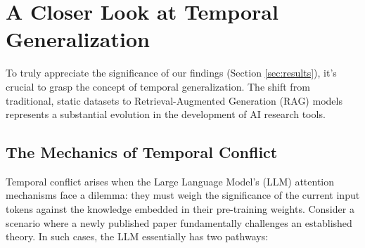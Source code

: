 \documentclass[acmsmall,screen,nonacm]{acmart}
\begin{document}
\begin{table}[t]
\caption{Looking at how our approach differs from existing research.}
\label{tab:comparative}
\centering
{}
\end{table}

\section{A Closer Look at Temporal Generalization}

To truly appreciate the significance of our findings (Section \ref{sec:results}), it's crucial to grasp the concept of temporal generalization. The shift from traditional, static datasets to Retrieval-Augmented Generation (RAG) models represents a substantial evolution in the development of AI research tools.

\subsection{The Mechanics of Temporal Conflict}

Temporal conflict arises when the Large Language Model's (LLM) attention mechanisms face a dilemma: they must weigh the significance of the current input tokens against the knowledge embedded in their pre-training weights. Consider a scenario where a newly published paper fundamentally challenges an established theory. In such cases, the LLM essentially has two pathways:
\end{document}
